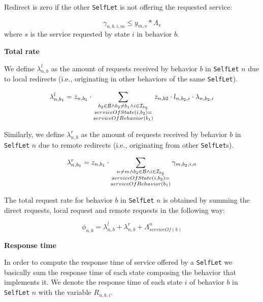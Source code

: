 \documentclass[11pt]{amsart}
\newcommand{\slet}{\texttt{SelfLet}}
\newcommand{\moreslet}{\texttt{SelfLet}s}
\begin{document}
Redirect is zero if the other \slet{} is not offering the requested service:

$$
	\gamma_{n, b, i, m} \leq y_{m,s} * \Lambda_s
$$
where $s$ is the service requested by state $i$ in behavior $b$.



{\bf Total rate}

We define $\lambda_{n,b}^l$ as the amount of requests received by behavior $b$ in \slet{} $n$ due to local redirects (i.e., originating in other behaviors of the same \slet{}).

$$
	\lambda_{n,b_1}^l = z_{n,b_1} \cdot 
							\sum_{ 
							\begin{subarray}{c} 
								b_2 \in \mathcal{B}   \wedge
								b_2 \neq b_1 \wedge
								i \in \mathcal{I}_{b_{2}} \\ 
								serviceOfState(i,b_2) = \\ 
								serviceOfBehavior(b_1) 
							\end{subarray} } 
		z_{n,b2} \cdot l_{n, b_2,i} \cdot \lambda_{n, b_2,i}
$$


Similarly, we define $\lambda_{n,b}^r$ as the amount of requests received by behavior $b$ in \slet{} $n$ due to remote redirects (i.e., originating from other \moreslet{}).

$$
	\lambda_{n,b_1}^r = z_{n,b_1} \cdot \sum_{ 
											\begin{subarray}{c} 
												n \neq m \wedge
												b_2 \in \mathcal{B} \wedge
												i \in \mathcal{I}_{b_2} \\
												serviceOfState(i,b_2) = \\ 
												serviceOfBehavior(b_1) 
											\end{subarray}
											} \gamma_{m, b_2, i, n}
$$

The total request rate for behavior $b$ in \slet{} $n$ is obtained by summing the direct requests, local request and remote requests in the following way:

$$
	\phi_{n,b} = \lambda_{n,b}^l + \lambda_{n,b}^r + \Lambda_{serviceOf(b)}^n
$$



{\bf Response time}

In order to compute the response time of service offered by a \slet{} we basically sum the response time of each state composing the behavior that implements it. We denote the response time of each state $i$ of behavior $b$ in \slet{} $n$ with the variable $R_{n,b,i}$.
\end{document}
